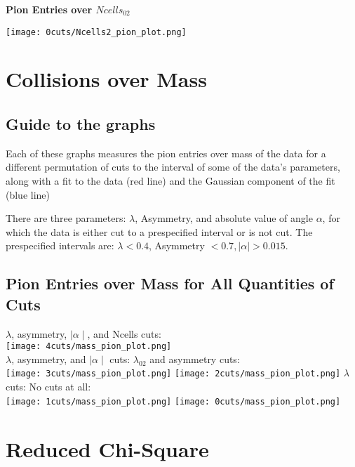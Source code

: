 \documentclass[11pt]{article}
\begin{document}
\begin{frame}{} %
\centering
\textbf{Pion Entries over $Ncells_{02}$}\par\medskip
\texttt{[image: 0cuts/Ncells2\_pion\_plot.png]}
\end{frame}

\section{Collisions over Mass}
\subsection{Guide to the graphs} %
Each of these graphs measures the pion entries over mass of the data for a different permutation of cuts to the interval of some of the data's parameters, along with a fit to the data (red line) and the Gaussian component of the fit (blue line)

There are three parameters: $\lambda$, Asymmetry, and absolute value of angle $\alpha$, for which the data is either cut to a prespecified interval or is not cut. The prespecified intervals are: $\lambda < 0.4$, Asymmetry $< 0.7, \mid\alpha\mid > 0.015 $.
\subsection{Pion Entries over Mass for All Quantities of Cuts} %
\begin{frame}{}
$\lambda$, asymmetry, $\mid\alpha\mid$, and Ncells cuts:\\
\texttt{[image: 4cuts/mass\_pion\_plot.png]}\\
$\lambda$, asymmetry, and $\mid\alpha\mid$ cuts:
\noindent\hspace{3 cm}$\lambda_{02}$ and asymmetry cuts:\\
\texttt{[image: 3cuts/mass\_pion\_plot.png]}
\texttt{[image: 2cuts/mass\_pion\_plot.png]}
$\lambda$ cuts:
\noindent\hspace{4 cm} No cuts at all:\\
\texttt{[image: 1cuts/mass\_pion\_plot.png]}
\texttt{[image: 0cuts/mass\_pion\_plot.png]}
\end{frame}

\section{Reduced Chi-Square}
\end{document}
